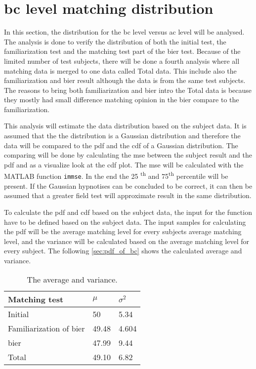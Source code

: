 \section{\gls{bc} level matching distribution}
In this section, the distribution for the \gls{bc} level versus \gls{ac} level will be analysed. The analysis is done to verify the distribution of both the initial test, the familiarization test and the matching test part of the \gls{bier} test. Because of the limited number of test subjects, there will be done a fourth analysis where all matching data is merged to one data called Total data. This include also the familiarization and \gls{bier} result although the data is from the same test subjects. The reasons to bring both familiarization and \gls{bier} intro the Total data is because they mostly had small difference matching opinion in the \gls{bier} compare to the familiarization.


This analysis will estimate the data distribution based on the subject data. It is assumed that the the distribution is a Gaussian distribution and therefore the data will be compared to the \gls{pdf} and the \gls{cdf} of a Gaussian distribution. The comparing will be done by calculating the \gls{mse} between the subject result and the \gls{pdf} and as a visualize look at the \gls{cdf} plot. The \gls{mse} will be calculated with the MATLAB function \texttt{immse}. In the end the 25 \textsuperscript{th} and 75\textsuperscript{th} percentile will be present. If the Gaussian hypnotises can be concluded to be correct, it can then be assumed that a greater field test will approximate result in the same distribution.

To calculate the \gls{pdf} and \gls{cdf} based on the subject data, the input for the function have to be defined based on the subject data. The input samples for calculating the  \gls{pdf} will be the average matching level for every subjects average matching level, and the variance will be calculated based on the average matching level for every subject. The following \autoref{sec:pdf_of_bc} shows the calculated average and variance. 

\begin{table}[H]
\centering
\caption{The average and variance.}
\begin{tabular}{l|ll}
Matching test                 & $\mu$ & $\sigma^2$ \\ \hline
Initial                       & 50    & 5.34       \\
Familiarization of \gls{bier} & 49.48 & 4.604      \\
\gls{bier}                    & 47.99 & 9.44      \\
Total                    & 49.10 & 6.82      
\end{tabular}
\label{sec:pdf_of_bc}
\end{table}

